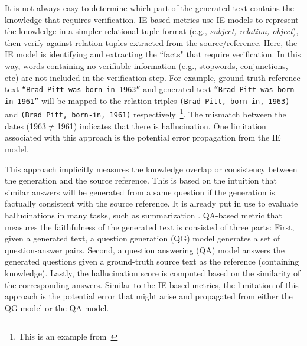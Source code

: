 It is not always easy to determine which part of the generated text contains the knowledge that requires verification. IE-based metrics use IE models to represent the knowledge in a simpler relational tuple format (e.g., \textit{subject, relation, object}), then verify against relation tuples extracted from the source/reference. 
Here, the IE model is identifying and extracting the ``facts" that require verification. In this way, words containing no verifiable information (e.g., stopwords, conjunctions, etc) are not included in the verification step.
For example, ground-truth reference text \texttt{``Brad Pitt was born in 1963''} and generated text \texttt{``Brad Pitt was born in 1961''} will be mapped to the relation triples \texttt{(Brad Pitt, born-in, 1963)} and \texttt{(Brad Pitt, born-in, 1961)} respectively~\footnote{This is an example from~}. The mismatch between the dates (1963$\neq$1961) indicates that there is hallucination. 
One limitation associated with this approach is the potential error propagation from the IE model.

This approach implicitly measures the knowledge overlap or consistency between the generation and the source reference. This is based on the intuition that similar answers will be generated from a same question if the generation is factually consistent with the source reference. It is already put in use to evaluate hallucinations in many tasks, such as summarization .
QA-based metric that measures the faithfulness of the generated text is consisted of three parts: First, given a generated text, a question generation (QG) model generates a set of question-answer pairs. 
Second, a question answering (QA) model answers the generated questions given a ground-truth source text as the reference (containing knowledge). Lastly, the hallucination score is computed based on the similarity of the corresponding answers.
Similar to the IE-based metrics, the limitation of this approach is the potential error that might arise and propagated from either the QG model or the QA model.

